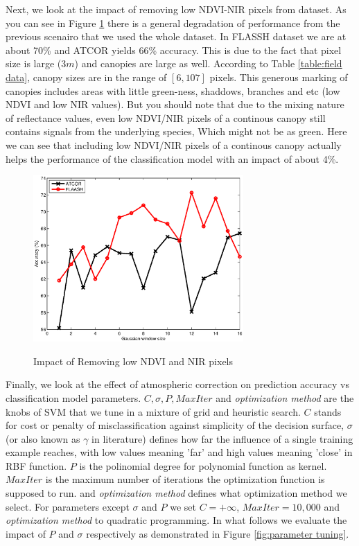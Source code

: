 \documentclass[remotesensing,article,accept,moreauthors,pdftex,12pt,a4paper]{mdpi}
\begin{document}
Next, we look at the impact of removing low NDVI-NIR pixels from dataset. As you can see in Figure \ref{fig:after removing NDVI NIR} there is a general degradation of performance from the previous scenairo that we used the whole dataset. 
In FLASSH dataset we are at about 70\% and ATCOR yields 66\% accuracy.
This is due to the fact that pixel size is large ($3m$) and canopies are large as well. 
According to Table \ref{table:field data}, canopy sizes are in the range of $[6,107]$ pixels. 
This generous marking of canopies includes areas with little green-ness, shaddows, branches and etc (low NDVI and low NIR values). 
But you should note that due to the mixing nature of reflectance values, even low NDVI/NIR pixels of a continous canopy still contains signals from the underlying species,
Which might not be as green.
Here we can see that including low NDVI/NIR pixels of a continous canopy actually helps the performance of the classification model with an impact of about 4\%.


\begin{figure}[tp]
  \centering
    {\includegraphics[height=2.5in,keepaspectratio]{./images/after-removing-ndvi-nir.eps}}\hspace{1em}%

   \caption{Impact of Removing low NDVI and NIR pixels}
       \label{fig:after removing NDVI NIR}
\end{figure}


Finally, we look at the effect of atmospheric correction on prediction accuracy vs classification model parameters.
$C, \sigma, P, MaxIter$ and \textit{optimization method} are the knobs of SVM that we tune in a mixture of grid and heuristic search.
$C$ stands for cost or penalty of misclassification against simplicity of the decision surface, $\sigma$ (or also known as $\gamma$ in literature) defines how far the influence of a single training example reaches, with low values meaning 'far' and high values meaning 'close' in RBF function.
$P$ is the polinomial degree for polynomial function as kernel. $MaxIter$ is the maximum number of iterations the optimization function is supposed to run. 
and \textit{optimization method} defines what optimization method we select. 
For parameters except $\sigma$ and $P$ we set $C=+\infty$, $ MaxIter=10,000$ and \textit{optimization method} to quadratic programming. 
In what follows we evaluate the impact of $P$ and $\sigma$ respectively as demonstrated in Figure \ref{fig:parameter tuning}.
 
\end{document}
